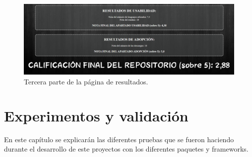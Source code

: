 \documentclass[a4paper, 12pt]{book}
\begin{document}
\begin{figure}
    
    \includegraphics[bb=0 0 800 600, width=12cm, keepaspectratio]{img/resultados_3.png}
    \caption{Tercera parte de la página de resultados.}\label{fig:resultados_3}
\end{figure}
\cleardoublepage
\chapter{Experimentos y validación}
\label{chap:experimentos}
En este capítulo se explicarán las diferentes pruebas que se fueron haciendo durante el desarrollo de este proyectos con los diferentes paquetes y frameworks.
\end{document}
